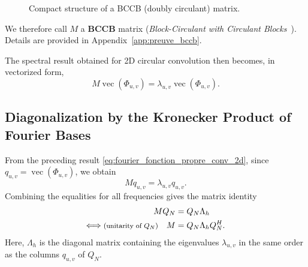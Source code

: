 \begin{figure}[H]

\caption{Compact structure of a BCCB (doubly circulant) matrix.}
\label{fig:bccb-structure}
\end{figure}

We therefore call $M$ a \textbf{BCCB} matrix (\textit{Block-Circulant with Circulant Blocks}~\cite{jain1989fundamentals}).
Details are provided in Appendix~\ref{app:preuve_bccb}.

The spectral result obtained for 2D circular convolution then becomes, in vectorized form,
\[
    M\operatorname{vec}(\Phi_{u,v})
    =
    \lambda_{u,v}\operatorname{vec}(\Phi_{u,v}).
\]

\subsection{Diagonalization by the Kronecker Product of Fourier Bases}

From the preceding result \ref{eq:fourier_fonction_propre_conv_2d}, since \(q_{u,v}=\operatorname{vec}(\Phi_{u,v})\), we obtain
\[
    M q_{u,v}
    =
    \lambda_{u,v} q_{u,v}.
\]
Combining the equalities for all frequencies gives the matrix identity
\begin{equation}
    \begin{split}
        M Q_N &= Q_N \Lambda_h \\
        \Longleftrightarrow \text{\footnotesize (unitarity of $Q_N$)} \quad M &= Q_N \Lambda_h Q_N^H.
    \end{split}
    \label{eq:diagonalisation_conv_2d}
\end{equation}
Here, $\Lambda_h$ is the diagonal matrix containing the eigenvalues $\lambda_{u,v}$
in the same order as the columns $q_{u,v}$ of $Q_N$.

